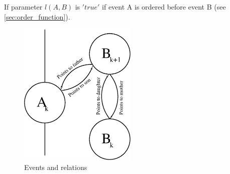 If parameter $l(A,B)$ is $'true'$ if event A is ordered before event B (see \cref{sec:order_function}).

\begin{figure}[H]
 \centering
 \includegraphics[width=0.5\textwidth]{fig/consensus_order.eps}
 \caption{Events and relations}
 \label{fig:consensus_order}
\end{figure}
